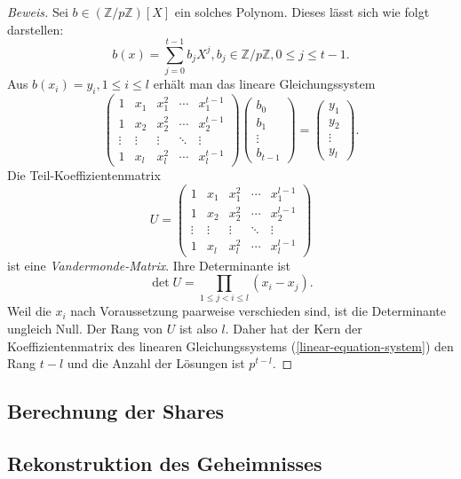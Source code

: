 \documentclass[12pt, a4paper, oneside, titlepage]{report}
\newcommand{\Z}{\mathds{Z}}
\newenvironment{bew}{\begin{proof}[Beweis]}{\end{proof}}
\theoremstyle{definition}
\begin{document}
\begin{bew}
		Sei $ b \in (\Z / p\Z)[X] $ ein solches Polynom. Dieses lässt sich wie folgt darstellen:
		$$ b(x) = \sum_{j=0}^{t-1} b_j X^j, b_j \in \Z / p\Z, 0 \leq j \leq t-1. $$
		Aus $ b(x_i) = y_i, 1 \leq i \leq l $ erhält man das lineare Gleichungssystem
		\begin{equation}\label{linear-equation-system}
			\begin{pmatrix}
			1 & x_1 & x_1^2 & \cdots & x_1^{t-1} \\
			1 & x_2 & x_2^2 & \cdots & x_2^{t-1} \\
			\vdots & \vdots & \vdots & \ddots & \vdots \\     
			1 & x_l & x_l^2 & \cdots & x_l^{t-1}
			\end{pmatrix}
			\begin{pmatrix}
			b_0 \\
			b_1 \\
			\vdots \\     
			b_{t-1}
			\end{pmatrix}
			=
			\begin{pmatrix}
			y_1 \\
			y_2 \\
			\vdots \\     
			y_l
			\end{pmatrix}.
		\end{equation}		
		Die Teil-Koeffizientenmatrix
		$$ U =
		\begin{pmatrix}
		1 & x_1 & x_1^2 & \cdots & x_1^{l-1} \\
		1 & x_2 & x_2^2 & \cdots & x_2^{l-1} \\
		\vdots & \vdots & \vdots & \ddots & \vdots \\     
		1 & x_l & x_l^2 & \cdots & x_l^{l-1}
		\end{pmatrix} $$
		ist eine \emph{Vandermonde-Matrix}. Ihre Determinante ist
		$$ \det U = \prod_{1 \leq j < i \leq l} (x_i-x_j). $$
		Weil die $ x_i $ nach Voraussetzung paarweise verschieden sind, ist die Determinante ungleich Null. Der Rang von $ U $ ist also $ l $. Daher hat der Kern der Koeffizientenmatrix des linearen Gleichungssystems (\ref{linear-equation-system}) den Rang $ t-l $ und die Anzahl der Lösungen ist $ p^{t-l} $.
	\end{bew}
	
	\subsection{Berechnung der Shares}
	\subsection{Rekonstruktion des Geheimnisses}
\end{document}
